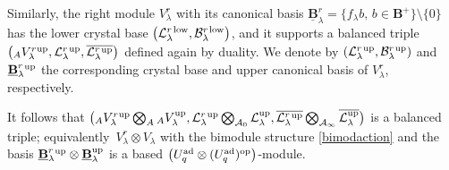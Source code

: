 \documentclass[pdftex]{sigma}
\numberwithin{equation}{section}
\theoremstyle{definition}
\newcommand{\Ll}{{\mathcal L}}
\begin{document}
Similarly, the right module $V_\lambda^r$ with its canonical basis $\underline{\mathbf{B}}_\lambda^r{}=\{f_\lambda b,\, b\in \mathbf{B}^+\}\setminus \{0\}$ has the lower crystal base $\big(\Ll_{\lambda}^r{}^{\rm low},\mathcal{B}_\lambda^r{}^{\rm low}\big)$, and it supports a balanced triple $\big({}_AV_\lambda^r{}^{\rm up},\Ll_{\lambda} ^r{}^{\rm up},\overline{\Ll_{\lambda} ^r{}^{\rm up}}\big)$ defined again by duality. We denote by $(\Ll_{\lambda}^r{}^{\rm up},\mathcal{B}_\lambda^r{}^{\rm up})$ and $\underline{\mathbf{B}}_\lambda^r{}^{\rm up}$ the corresponding crystal base and upper canonical basis of $V_\lambda^r$, respectively.

It follows that $\big({}_AV_\lambda^r{}^{\rm up}\bigotimes_A {}_AV_\lambda^{\rm up},\Ll_{\lambda}^r{}^{\rm up} \bigotimes_{\mathcal{A}_0}\Ll_{\lambda}^{\rm up},\overline{\Ll_{\lambda}^r{}^{\rm up}}\bigotimes_{\mathcal{A}_\infty}\overline{\Ll_{\lambda}^{\rm up}}\big)$ is a balanced triple; equivalently~${V_\lambda^r \otimes V_\lambda}$ with the bimodule structure \eqref{bimodaction} and the basis $\underline{\mathbf{B}}_\lambda^r{}^{\rm up}\otimes \underline{\mathbf{B}}_\lambda^{\rm up}$ is a based $\big(U_q^{\rm ad} \otimes (U_q^{\rm ad})^{\rm op}\big)$-module.
\end{document}
